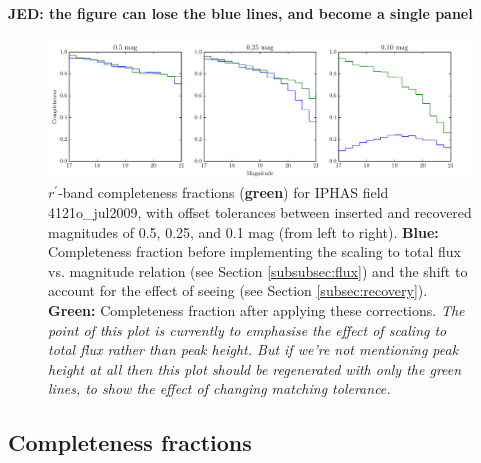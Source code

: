 \documentclass[a4paper,useAMS,usenatbib]{mn2e}
\begin{document}
{\bf JED: the figure can lose the blue lines, and become a single panel}

\begin{figure}
\begin{center}
\includegraphics[width=1\linewidth]{figures/magnitude_match.pdf} 
\caption{\footnotesize{$r^{\prime}$-band completeness fractions (\textbf{green}) for IPHAS 
field 4121o\_jul2009, with offset tolerances between inserted and recovered magnitudes of 0.5, 
0.25, and 0.1 mag (from left to right). \textbf{Blue:} Completeness fraction before 
implementing the scaling to total flux vs. magnitude relation (see Section \ref{subsubsec:flux}) 
and the shift to account for the effect of seeing (see Section \ref{subsec:recovery}). 
\textbf{Green:} Completeness fraction after applying these corrections. \newline
\textit{The point of this plot is currently to emphasise the effect of scaling to total flux rather 
than peak height. But if we're not mentioning peak height at all then this plot should be regenerated 
with only the green lines, to show the effect of changing matching tolerance.}}}
\label{fig:magnitude_match}
\end{center}
\end{figure}

\subsection{Completeness fractions}
\end{document}
